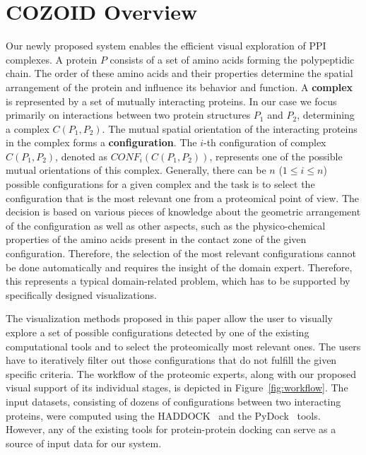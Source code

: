 \documentclass{bmcart}
\begin{document}
\section{COZOID Overview}
Our newly proposed system enables the efficient visual exploration of PPI complexes.
A protein $P$ consists of a set of amino acids forming the polypeptidic chain.
The order of these amino acids and their properties determine the spatial arrangement of the protein and influence its behavior and function.
A \textbf{complex} is represented by a set of mutually interacting proteins.
In our case we focus primarily on interactions between two protein structures $P_1$ and $P_2$, determining a complex $C(P_1,P_2)$.
The mutual spatial orientation of the interacting proteins in the complex forms a \textbf{configuration}.
The $i$-th configuration of complex $C(P_1,P_2)$, denoted as $CONF_i(C(P_1,P_2))$, represents one of the possible mutual orientations of this complex.
Generally, there can be $n$ ($1 \leq i \leq n$) possible configurations for a given complex and the task is to select the configuration that is the most relevant one from a proteomical point of view.
The decision is based on various pieces of knowledge about the geometric arrangement of the configuration as well as other aspects, such as the physico-chemical properties of the amino acids present in the contact zone of the given configuration.
Therefore, the selection of the most relevant configurations cannot be done automatically and requires the insight of the domain expert.
Therefore, this represents a typical domain-related problem, which has to be supported by specifically designed visualizations.

The visualization methods proposed in this paper allow the user to visually explore a set of possible configurations detected by one of the existing computational tools and to select the proteomically most relevant ones.
The users have to iteratively filter out those configurations that do not fulfill the given specific criteria.
The workflow of the proteomic experts, along with our proposed visual support of its individual stages, is depicted in Figure~\ref{fig:workflow}.
The input datasets, consisting of dozens of configurations between two interacting proteins, were computed using the HADDOCK~\cite{haddock} and the PyDock~\cite{pydock} tools. 
However, any of the existing tools for protein-protein docking can serve as a source of input data for our system.
\end{document}
